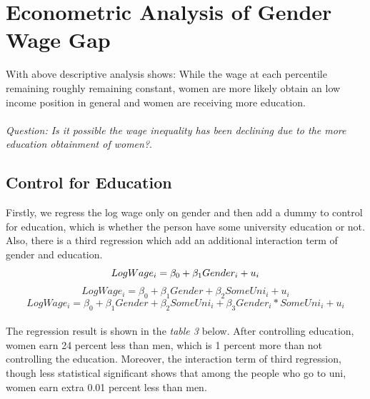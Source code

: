\documentclass{article}
\begin{document}
\section{Econometric Analysis of Gender Wage Gap}
With above descriptive analysis shows: While the wage at each percentile remaining roughly remaining constant, women are more likely obtain an low income position in general and women are receiving more education. \\~\\
\textit{Question: Is it possible the wage inequality has been declining due to the more education obtainment of women?}.\\

\subsection{Control for Education}
Firstly, we regress the log wage only on gender and then add a dummy to control for education, which is whether the person have some university education or not. Also, there is a third regression which add an additional interaction term of gender and education.\\
\begin{equation}
    LogWage_{i}=\beta_0+\beta_1Gender_i +u_i\newline
\end{equation}
\begin{equation}
    LogWage_{i}=\beta_0+\beta_1Gender+\beta_2SomeUni_i+u_i
\end{equation}
\begin{equation}
    LogWage_{i}=\beta_0+\beta_1Gender+\beta_2SomeUni_i+\beta_3Gender_i*SomeUni_i+u_i
\end{equation}\\
The regression result is shown in the \textit{table 3} below. After controlling education, women earn 24 percent less than men, which is 1 percent more than not controlling the education. Moreover, the interaction term of third regression, though less statistical significant shows that among the people who go to uni, women earn extra 0.01 percent less than men. \\~\
\end{document}
